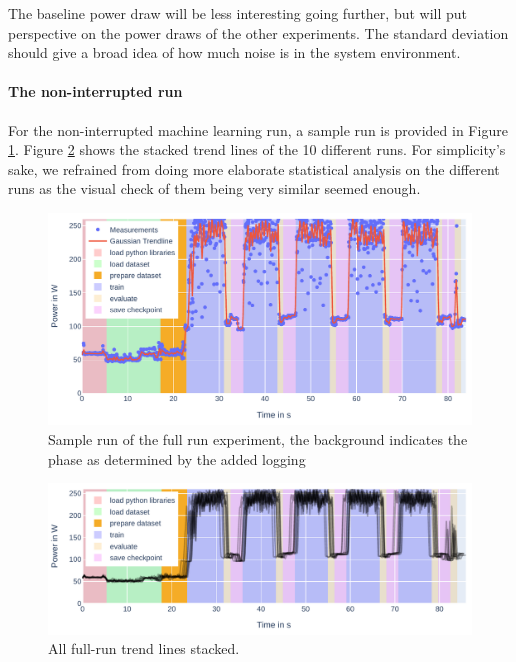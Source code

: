 The baseline power draw will be less interesting going further, but will put perspective on the power draws of the other experiments. The standard deviation should give a broad idea of how much noise is in the system environment.

\paragraph{The non-interrupted run}

For the non-interrupted machine learning run, a sample run is provided in Figure \ref{fig:plot_full}. 
Figure \ref{fig:plot_full_stacked} shows the stacked trend lines of the 10 different runs.
For simplicity's sake, we refrained from doing more elaborate statistical analysis on the different runs as the visual check of them being very similar seemed enough.

\begin{figure}
    \includegraphics[width=\linewidth]{power-measurements/measurements_roberta_full_0714010405/plot.pdf}
    \caption{Sample run of the full run experiment, the background indicates the phase as determined by the added logging}
    \label{fig:plot_full}
\end{figure}

\begin{figure}
    \includegraphics[width=\linewidth]{power-measurements/stacked_plots/roberta_full_0714.pdf}
    \caption{All full-run trend lines stacked. }
    \label{fig:plot_full_stacked}
\end{figure}

